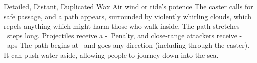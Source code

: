   {Detailed, Distant, Duplicated}%
  {Wax}%
  {Air}%
  {wind or tide's potence}%
  {The caster calls for safe passage, and a path appears, surrounded by violently whirling clouds, which repels anything which might harm those who walk inside.
  The path stretches ~\glspl{step} long.
  Projectiles receive a -~Penalty, and close-range attackers receive -~\glspl{ap}}%
  {
  The path begins at \spellRange\ and goes any direction (including through the caster).
  It can push water aside, allowing people to journey down into the sea.}
